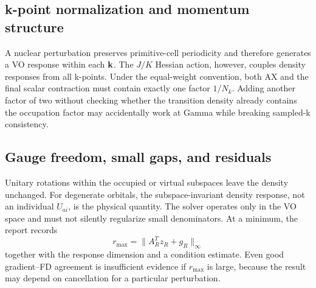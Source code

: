 \subsection{k-point normalization and momentum structure}

A nuclear perturbation preserves primitive-cell periodicity and therefore
generates a VO response within each $\mathbf{k}$.  The $J/K$ Hessian action, however,
couples density responses from all k-points.  Under the equal-weight
convention, both AX and the final scalar contraction must contain exactly one
factor $1/N_k$.  Adding another factor of two without checking whether the
transition density already contains the occupation factor may accidentally
work at Gamma while breaking sampled-k consistency.

\subsection{Gauge freedom, small gaps, and residuals}

Unitary rotations within the occupied or virtual subspaces leave the density
unchanged.  For degenerate orbitals, the subspace-invariant density response,
not an individual $U_{ai}$, is the physical quantity.  The solver operates only
in the VO space and must not silently regularize small denominators.  At a
minimum, the report records
\begin{equation}
  r_{\max}=\|A_R^Tz_R+g_R\|_\infty
  \label{eq:zvector-residual}
\end{equation}
together with the response dimension and a condition estimate.  Even good
gradient--FD agreement is insufficient evidence if $r_{\max}$ is large,
because the result may depend on cancellation for a particular perturbation.
